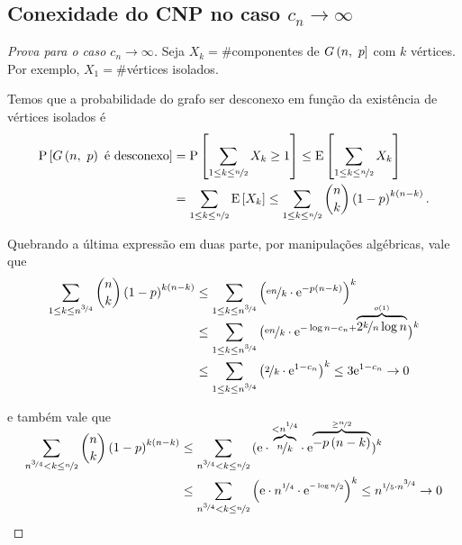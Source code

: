 \subsection{Conexidade do CNP no caso $c_n\rightarrow\infty$}
\begin{proof}[Prova para o caso $c_n\rightarrow\infty$]
  Seja $X_k=\#$componentes de $G\left(n,\ p\vphantom{1j}\right]$ com $k$ vértices. Por exemplo, $X_1=\#$vértices isolados.

  Temos que a probabilidade do grafo ser desconexo em função da existência de vértices isolados é
  \vspace*{-\baselineskip}
  \begin{align*}
    \mathrm{P}\left[G\left(n,\ p\vphantom{1j}\right)\text{ é desconexo}\vphantom{1j}\right]
      &=    \mathrm{P}\left[\sum_{1\leq k\leq\nicefrac{n}{2}}X_k\geq 1\vphantom{1j}\right]
      \leq  \mathrm{E}\left[\sum_{1\leq k\leq\nicefrac{n}{2}}\vphantom{1j}X_k\right]                   \\
      &=    \sum_{1\leq k\leq\nicefrac{n}{2}}\mathrm{E}\left[X_k\vphantom{1j}\right]
      \leq  \sum_{1\leq k\leq\nicefrac{n}{2}}\binom{n}{k}\left(1-p\vphantom{1j}\right)^{k\left(n-k\vphantom{1j}\right)}.
  \end{align*}

  Quebrando a última expressão em duas parte, por manipulações algébricas, vale que
  \begin{align*}
    \sum_{1\leq k\leq n^{\nicefrac{3}{4}}}\binom{n}{k}\left(1-p\vphantom{1j}\right)^{k\left(n-k\vphantom{1j}\right)}
      &\leq \sum_{1\leq k\leq n^{\nicefrac{3}{4}}}\left(\nicefrac{\mathrm{e} n}{k}\cdot\mathrm{e}^{-p\left(n-k\vphantom{1j}\right)}\vphantom{1j}\right)^k  \\
      &\leq \sum_{1\leq k\leq n^{\nicefrac{3}{4}}}
              \left(\nicefrac{\mathrm{e} n}{k}\cdot\mathrm{e}^{-\log n-c_n+\smash{\overbrace{2\nicefrac{k}{n}\log n}^{o(1)}}}\vphantom{1j}\right)^k \\
      &\leq \sum_{1\leq k\leq n^{\nicefrac{3}{4}}}\left(\nicefrac{2}{k}\cdot\mathrm{e}^{1-c_n}\vphantom{1j}\right)^k
      \leq  3\mathrm{e}^{1-c_n} 
      \rightarrow 0
  \end{align*}

  e também vale que
  \begin{align*}
    \sum_{n^{\nicefrac{3}{4}}<k\leq\nicefrac{n}{2}}\binom{n}{k}\left(1-p\vphantom{1j}\right)^{k\left(n-k\vphantom{1j}\right)}
      &\leq \sum_{n^{\nicefrac{3}{4}}<k\leq\nicefrac{n}{2}}
              \left(\mathrm{e}\cdot\smash{\overbrace{\nicefrac{n}{k}}^{<n^{\nicefrac{1}{4}}}}\cdot
              \mathrm{e}^{\smash{\overbrace{-p\left(n-k\vphantom{1j}\right)}^{\geq\nicefrac{n}{2}}}}\vphantom{1j}\right)^k                             \\
      &\leq \sum_{n^{\nicefrac{3}{4}}<k\leq\nicefrac{n}{2}}\left(\mathrm{e}\cdot n^{\nicefrac{1}{4}}\cdot\mathrm{e}^{\nicefrac{-\log n}{2}}\vphantom{1j}\right)^k
      \leq  n^{\nicefrac{1}{5}\cdot n^{\nicefrac{3}{4}}}
      \rightarrow 0
  \end{align*}


\end{proof}
